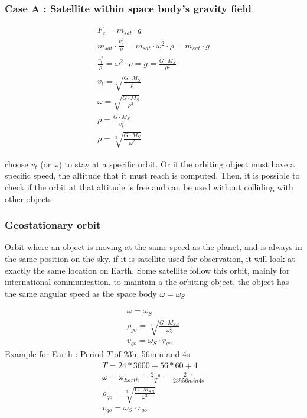 \documentclass[12pt,a4paper]{article}
\begin{document}
\subsubsection{Case A : Satellite within space body's gravity field}

\begin{eqnarray}
	F_c = m_{sat} \cdot g \\
	m_{sat} \cdot \frac{v_t^2}{\rho}  = m_{sat} \cdot \omega^2 \cdot \rho= m_{sat} \cdot g\\
	\frac{v_t^2}{\rho} = \omega^2 \cdot \rho = g =\frac{ G \cdot M_{S}}{\rho^2}\\
	v_t = \sqrt{\frac{ G \cdot M_{S}}{\rho}}\\
	\omega = \sqrt{\frac{ G \cdot M_{S}}{\rho^3}}\\
	\rho = \frac{ G \cdot M_{S}}{v_t^2}\\
	\rho = \sqrt[3]{\frac{ G \cdot M_{S}}{\omega^2}}
\end{eqnarray}

choose $v_t$ (or $\omega$) to stay at a specific orbit. Or if the orbiting object must have a specific speed, the altitude that it must reach is computed. Then, it is possible to check if the orbit at that altitude is free and can be used without colliding with other objects.
 
\subsubsection{Geostationary orbit}
Orbit where an object is moving at the same speed as the planet, and is always in the same position on the sky.
if it is satellite used for observation, it will look at exactly the same location on Earth. 
Some satellite follow this orbit, mainly for international communication. 
to maintain a the orbiting object, the object has the same angular speed as the space body $\omega=\omega_{S}$

\begin{eqnarray}
	\omega = \omega_{S}\\
	\rho_{go} = \sqrt[3]{\frac{ G \cdot M_{SB}}{\omega_{S}^2}}\\
	v_{go} = \omega_{S} \cdot r_{go}
\end{eqnarray}
Example for Earth : Period $T$ of 23h, 56min and 4s
\begin{eqnarray}
	T = 24*3600 + 56 * 60 + 4\\
	\omega = \omega_{Earth}= \frac{2 \cdot \pi}{T} = \frac{2 \cdot \pi}{23h 56min 4s}\\
	\rho_{go} = \sqrt[3]{\frac{ G \cdot M_{SB}}{\omega^2}}\\
	v_{go} = \omega_{S} \cdot r_{go}
\end{eqnarray}
\end{document}
